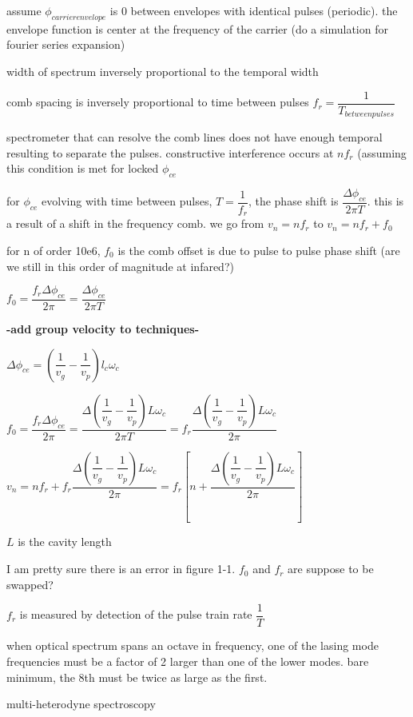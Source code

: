 \documentclass[11pt,a4paper]{book}
\begin{document}
assume $\phi_{carrier envelope}$ is 0 between envelopes with identical pulses (periodic). the envelope function is center at the frequency of the carrier (do a simulation for fourier series expansion)

width of spectrum inversely proportional to the temporal width

comb spacing is inversely proportional to time between pulses $f_r = \dfrac{1}{T_{between pulses}}$

spectrometer that can resolve the comb lines does not have enough temporal resulting to separate the pulses. constructive interference occurs at $nf_r$ (assuming this condition is met for locked $\phi_{ce}$

for $\phi_{ce}$ evolving with time between pulses, $T=\dfrac{1}{f_r}$, the phase shift is  $\dfrac{\Delta \phi_{ce}}{2 \pi T}$. this is a result of a shift in the frequency comb. we go from $v_n = nf_r$ to $v_n=nf_r +f_0$

for n of order 10e6, $f_0$ is the comb offset is due to pulse to pulse phase shift (are we still in this order of magnitude at infared?)

$f_0 = \dfrac{f_r \Delta \phi_{ce}}{2\pi}= \dfrac{\Delta \phi_{ce}}{2\pi T}$

{\bfseries -add group velocity to techniques-}

$\Delta \phi_{ce} = \left( \dfrac{1}{v_g} - \dfrac{1}{v_p} \right) l_c \omega_c$

$f_0 = \dfrac{f_r \Delta \phi_{ce}}{2\pi}= \dfrac{\Delta \left( \dfrac{1}{v_g} - \dfrac{1}{v_p} \right) L \omega_c}{2\pi T} = f_r \dfrac{\Delta \left( \dfrac{1}{v_g} - \dfrac{1}{v_p} \right) L \omega_c}{2\pi}$

$v_n = nf_r + f_r \dfrac{\Delta \left( \dfrac{1}{v_g} - \dfrac{1}{v_p} \right) L \omega_c}{2\pi} = f_r \left[ n+\dfrac{\Delta \left( \dfrac{1}{v_g} - \dfrac{1}{v_p} \right) L \omega_c}{2\pi} \right]$

$L$ is the cavity length

I am pretty sure there is an error in figure 1-1. $f_0$ and $f_r$ are suppose to be swapped?

$f_r$ is measured by detection of the pulse train rate $\dfrac{1}{T}$

when optical spectrum spans an octave in frequency, one of the lasing mode frequencies must be a factor of 2 larger than one of the lower modes. bare minimum, the 8th must be twice as large as the first.

multi-heterodyne spectroscopy
\end{document}
